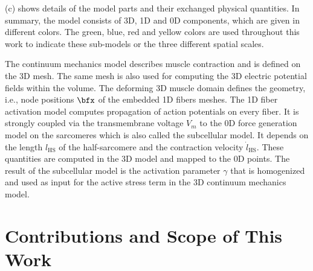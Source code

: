  (c) shows details of the model parts and their exchanged physical quantities. In summary, the model consists of 3D, 1D and 0D components, which are given in different colors.
The green, blue, red and yellow colors are used throughout this work to indicate these sub-models or the three different spatial scales.

The continuum mechanics model describes muscle contraction and is defined on the 3D mesh. The same mesh is also used for computing the 3D electric potential fields within the volume. The deforming 3D muscle domain defines the geometry, i.e., node positions $\bfx$ of the embedded 1D fibers meshes. The 1D fiber activation model computes propagation of action potentials on every fiber. It is strongly coupled via the transmembrane voltage $V_m$ to the 0D force generation model on the sarcomeres which is also called the subcellular model. It depends on the length $l_\text{HS}$ of the half-sarcomere and the contraction velocity $\dot{l}_\text{HS}$. These quantities are computed in the 3D model and mapped to the 0D points. The result of the subcellular model is the activation parameter $\gamma$ that is homogenized and used as input for the active stress term in the 3D continuum mechanics model.

\section{Contributions and Scope of This Work}\label{sec:intro_contributions}


